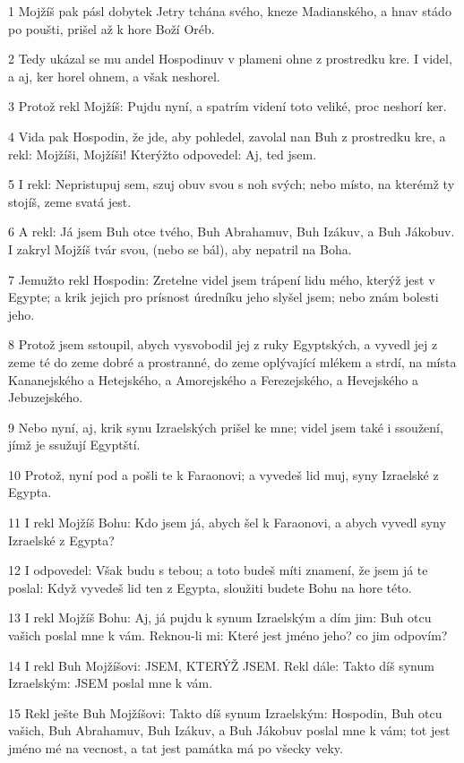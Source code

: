 \par 1 Mojžíš pak pásl dobytek Jetry tchána svého, kneze Madianského, a hnav stádo po poušti, prišel až k hore Boží Oréb.
\par 2 Tedy ukázal se mu andel Hospodinuv v plameni ohne z prostredku kre. I videl, a aj, ker horel ohnem, a však neshorel.
\par 3 Protož rekl Mojžíš: Pujdu nyní, a spatrím videní toto veliké, proc neshorí ker.
\par 4 Vida pak Hospodin, že jde, aby pohledel, zavolal nan Buh z prostredku kre, a rekl: Mojžíši, Mojžíši! Kterýžto odpovedel: Aj, ted jsem.
\par 5 I rekl: Nepristupuj sem, szuj obuv svou s noh svých; nebo místo, na kterémž ty stojíš, zeme svatá jest.
\par 6 A rekl: Já jsem Buh otce tvého, Buh Abrahamuv, Buh Izákuv, a Buh Jákobuv. I zakryl Mojžíš tvár svou, (nebo se bál), aby nepatril na Boha.
\par 7 Jemužto rekl Hospodin: Zretelne videl jsem trápení lidu mého, kterýž jest v Egypte; a krik jejich pro prísnost úredníku jeho slyšel jsem; nebo znám bolesti jeho.
\par 8 Protož jsem sstoupil, abych vysvobodil jej z ruky Egyptských, a vyvedl jej z zeme té do zeme dobré a prostranné, do zeme oplývající mlékem a strdí, na místa Kananejského a Hetejského, a Amorejského a Ferezejského, a Hevejského a Jebuzejského.
\par 9 Nebo nyní, aj, krik synu Izraelských prišel ke mne; videl jsem také i ssoužení, jímž je ssužují Egyptští.
\par 10 Protož, nyní pod a pošli te k Faraonovi; a vyvedeš lid muj, syny Izraelské z Egypta.
\par 11 I rekl Mojžíš Bohu: Kdo jsem já, abych šel k Faraonovi, a abych vyvedl syny Izraelské z Egypta?
\par 12 I odpovedel: Však budu s tebou; a toto budeš míti znamení, že jsem já te poslal: Když vyvedeš lid ten z Egypta, sloužiti budete Bohu na hore této.
\par 13 I rekl Mojžíš Bohu: Aj, já pujdu k synum Izraelským a dím jim: Buh otcu vašich poslal mne k vám. Reknou-li mi: Které jest jméno jeho? co jim odpovím?
\par 14 I rekl Buh Mojžíšovi: JSEM, KTERÝŽ JSEM. Rekl dále: Takto díš synum Izraelským: JSEM poslal mne k vám.
\par 15 Rekl ješte Buh Mojžíšovi: Takto díš synum Izraelským: Hospodin, Buh otcu vašich, Buh Abrahamuv, Buh Izákuv, a Buh Jákobuv poslal mne k vám; tot jest jméno mé na vecnost, a tat jest památka má po všecky veky.
